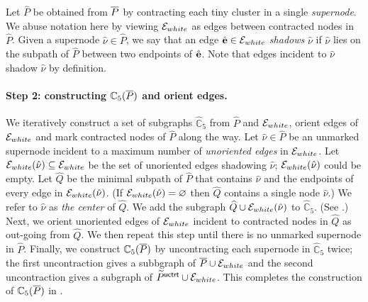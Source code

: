 Let $\widehat{P}$ be obtained from $\overline{P}$ by contracting each tiny cluster in a single \emph{supernode}. We abuse notation here by viewing  $\mathcal{E}_{white}$ as edges between contracted nodes in $\widehat{P}$.  Given a supernode $\hat{\nu}\in \widehat{P}$, we say that an edge  $\hat{\mathbf{e}}\in \mathcal{E}_{white}$ \emph{shadows} $\hat{\nu}$ if  $\hat{\nu}$ lies on the subpath of  $\widehat{P}$  between two endpoints of $\hat{\mathbf{e}}$. Note that edges incident to $\hat{\nu}$ shadow  $\hat{\nu}$  by definition. 


\paragraph{Step 2: constructing $ \mathbb{C}_5(\overline{P})$ and orient edges.~}  We iteratively construct a set of subgraphs $ \widehat{\mathbb{C}}_5$ from $\widehat{P}$ and $\mathcal{E}_{white}$, orient edges of $\mathcal{E}_{white}$ and mark contracted nodes of $\widehat{P}$ along the way.  Let  $\hat{\nu} \in \widehat{P}$ be an unmarked supernode  incident to a maximum number of \emph{unoriented edges} in $\mathcal{E}_{white}$. Let $\mathcal{E}_{white}(\hat{\nu})\subseteq \mathcal{E}_{white}$ be the set of unoriented edges shadowing $\hat{\nu}$; $\mathcal{E}_{white}(\hat{\nu})$ could be empty. Let  $\widehat{Q}$ be the minimal subpath of  $\widehat{P}$ that contains $\hat{\nu}$ and the endpoints of every edge in $\mathcal{E}_{white}(\hat{\nu})$. (If $\mathcal{E}_{white}(\hat{\nu}) = \varnothing$ then $\widehat{Q}$ contains a single node $\hat{\nu}$.) We refer to $\hat{\nu}$ as\emph{ the center} of  $\widehat{Q}$. We add the subgraph $\widehat{Q} \cup \mathcal{E}_{white}(\hat{\nu})$ to $ \widehat{\mathbb{C}}_5$. (See .) Next, we orient unoriented edges of  $\mathcal{E}_{white}$ incident to contracted nodes in $\widehat{Q}$ as out-going from $\widehat{Q}$. We then repeat this step until there is no unmarked supernode in $\widehat{P}$. Finally, we construct  $\mathbb{C}_5(\overline{P})$ by uncontracting each supernode  in $ \widehat{\mathbb{C}}_5$ twice; the first uncontraction gives a subbgraph of $\overline{P}\cup \mathcal{E}_{white}$ and the second uncontraction gives a subgraph of $\widetilde{P}^{\mathsf{uctrt}}\cup \mathcal{E}_{white}$.  This completes the construction of  $\mathbb{C}_5(\overline{P})$ in .

